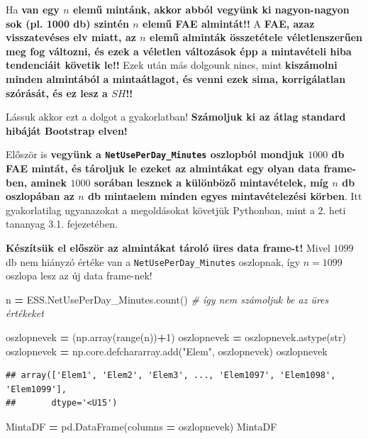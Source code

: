 \documentclass[
]{book}
\newenvironment{Shaded}{\begin{snugshade}}{\end{snugshade}}
\newcommand{\BuiltInTok}[1]{#1}
\newcommand{\CommentTok}[1]{\textcolor[rgb]{0.56,0.35,0.01}{\textit{#1}}}
\newcommand{\DecValTok}[1]{\textcolor[rgb]{0.00,0.00,0.81}{#1}}
\newcommand{\NormalTok}[1]{#1}
\newcommand{\OperatorTok}[1]{\textcolor[rgb]{0.81,0.36,0.00}{\textbf{#1}}}
\newcommand{\StringTok}[1]{\textcolor[rgb]{0.31,0.60,0.02}{#1}}
\begin{document}
Ha \textbf{van egy \(n\) elemű mintánk, akkor abból vegyünk ki nagyon-nagyon sok (pl. 1000 db) szintén \(n\) elemű FAE almintát!!} A \textbf{FAE, azaz visszatevéses elv miatt, az \(n\) elemű alminták összetétele véletlenszerűen meg fog változni, és ezek a véletlen változások épp a mintavételi hiba tendenciáit követik le!!}
Ezek után más dolgounk nincs, mint \textbf{kiszámolni minden almintából a mintaátlagot, és venni ezek sima, korrigálatlan szórását, és ez lesz a \(SH\)!!}

Lássuk akkor ezt a dolgot a gyakorlatban! \textbf{Számoljuk ki az átlag standard hibáját Bootstrap elven!}

Először is \textbf{vegyünk a \texttt{NetUsePerDay\_Minutes} oszlopból mondjuk \(1000\) db FAE mintát, és tároljuk le ezeket az almintákat egy olyan data frame-ben, aminek \(1000\) sorában lesznek a különböző mintavételek, míg \(n\) db oszlopában az \(n\) db mintaelem minden egyes mintavételezési körben}.
Itt gyakorlatilag ugyanazokat a megoldásokat követjük Pythonban, mint a 2. heti tananyag 3.1. fejezetében.

\textbf{Készítsük el először az almintákat tároló üres data frame-t!} Mivel \(1099\) db nem hiányzó értéke van a \texttt{NetUsePerDay\_Minutes} oszlopnak, így \(n=1099\) oszlopa lesz az új data frame-nek!

\begin{Shaded}
\begin{Highlighting}[]
\NormalTok{n }\OperatorTok{=}\NormalTok{ ESS.NetUsePerDay\_Minutes.count() }\CommentTok{\# így nem számoljuk be az üres értékeket}

\NormalTok{oszlopnevek }\OperatorTok{=}\NormalTok{ (np.array(}\BuiltInTok{range}\NormalTok{(n))}\OperatorTok{+}\DecValTok{1}\NormalTok{)}
\NormalTok{oszlopnevek }\OperatorTok{=}\NormalTok{ oszlopnevek.astype(}\BuiltInTok{str}\NormalTok{)}
\NormalTok{oszlopnevek }\OperatorTok{=}\NormalTok{ np.core.defchararray.add(}\StringTok{"Elem"}\NormalTok{, oszlopnevek)}
\NormalTok{oszlopnevek}
\end{Highlighting}
\end{Shaded}

\begin{verbatim}
## array(['Elem1', 'Elem2', 'Elem3', ..., 'Elem1097', 'Elem1098', 'Elem1099'],
##       dtype='<U15')
\end{verbatim}

\begin{Shaded}
\begin{Highlighting}[]
\NormalTok{MintaDF }\OperatorTok{=}\NormalTok{ pd.DataFrame(columns }\OperatorTok{=}\NormalTok{ oszlopnevek)}
\NormalTok{MintaDF}
\end{Highlighting}
\end{Shaded}
\end{document}

